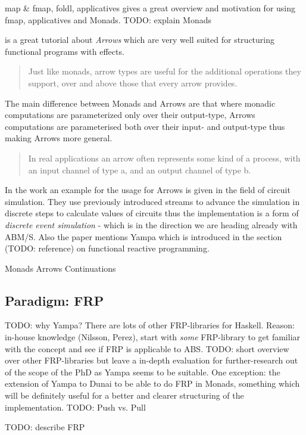 map \& fmap, foldl, applicatives
\cite{hutton_programming_2007} gives a great overview and motivation for using fmap, applicatives and Monads. TODO: explain Monads

\cite{Hughes2004} is a great tutorial about \textit{Arrows} which are very well suited for structuring functional programs with effects.

\begin{quote}
Just like monads, arrow types are useful for the additional operations they support, over and above those that every arrow provides.
\end{quote}

The main difference between Monads and Arrows are that where monadic computations are parameterized only over their output-type, Arrows computations are parameterised both over their input- and output-type thus making Arrows more general.

\begin{quote}
In real applications an arrow often represents some kind of a process, with an input channel of type a, and an output channel of type b.
\end{quote}

In the work \cite{Hughes2004} an example for the usage for Arrows is given in the field of circuit simulation. They use previously introduced streams to advance the simulation in discrete steps to calculate values of circuits thus the implementation is a form of \textit{discrete event simulation} - which is in the direction we are heading already with ABM/S. Also the paper mentions Yampa which is introduced in the section (TODO: reference) on functional reactive programming.


Monads
Arrows
Continuations
\subsection{Paradigm: FRP}
TODO: why Yampa? There are lots of other FRP-libraries for Haskell. Reason: in-house knowledge (Nilsson, Perez), start with \textit{some} FRP-library to get familiar with the concept and see if FRP is applicable to ABS. TODO: short overview over other FRP-libraries but leave a in-depth evaluation for further-research out of the scope of the PhD as Yampa seems to be suitable. One exception: the extension of Yampa to Dunai to be able to do FRP in Monads, something which will be definitely useful for a better and clearer structuring of the implementation.
TODO: Push vs. Pull

TODO: describe FRP

